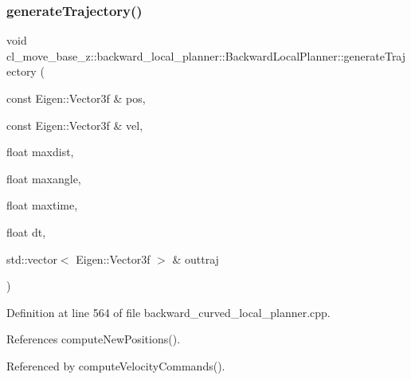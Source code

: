 \subsubsection{\texorpdfstring{generate\+Trajectory()}{generateTrajectory()}}
{\footnotesize\ttfamily void cl\+\_\+move\+\_\+base\+\_\+z\+::backward\+\_\+local\+\_\+planner\+::\+Backward\+Local\+Planner\+::generate\+Trajectory (\begin{DoxyParamCaption}\item[{const Eigen\+::\+Vector3f \&}]{pos,  }\item[{const Eigen\+::\+Vector3f \&}]{vel,  }\item[{float}]{maxdist,  }\item[{float}]{maxangle,  }\item[{float}]{maxtime,  }\item[{float}]{dt,  }\item[{std\+::vector$<$ Eigen\+::\+Vector3f $>$ \&}]{outtraj }\end{DoxyParamCaption})\hspace{0.3cm}{\ttfamily [private]}}



Definition at line 564 of file backward\+\_\+curved\+\_\+local\+\_\+planner.\+cpp.



References compute\+New\+Positions().



Referenced by compute\+Velocity\+Commands().


